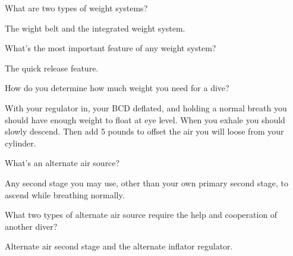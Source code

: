 	\begin{qanda}
		\begin{question}
What are two types of weight systems?
		\end{question}

		\begin{answer}
The wight belt and the integrated weight system.
		\end{answer}
	\end{qanda}

	\begin{qanda}
		\begin{question}
What's the most important feature of any weight system?
		\end{question}

		\begin{answer}
The quick release feature.
		\end{answer}
	\end{qanda}

	\begin{qanda}
		\begin{question}
How do you determine how much weight you need for a dive?
		\end{question}

		\begin{answer}
With your regulator in, your BCD deflated, and holding a normal breath you should have enough weight to float at eye level.  When you exhale you should slowly descend.  Then add 5 pounds to offset the air you will loose from your cylinder.
		\end{answer}
	\end{qanda}

	\begin{qanda}
		\begin{question}
What's an alternate air source?
		\end{question}

		\begin{answer}
Any second stage you may use, other than your own primary second stage, to ascend while breathing normally.
		\end{answer}
	\end{qanda}

	\begin{qanda}
		\begin{question}
What two types of alternate air source require the help and cooperation of another diver?
		\end{question}

		\begin{answer}
Alternate air second stage and the alternate inflator regulator.
		\end{answer}
	\end{qanda}

